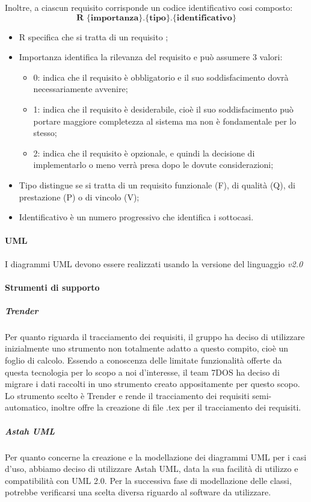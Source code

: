 Inoltre, a ciascun requisito corrisponde un codice identificativo cosi composto:
$$ \textbf{R \{importanza\}.\{tipo\}.\{identificativo\}  } $$
\begin{itemize}
	\item R specifica che si tratta di un requisito ;
	\item Importanza identifica la rilevanza del requisito e può assumere 3 valori:
	\begin{itemize}
		\item 0: indica che il requisito è obbligatorio e il suo soddisfacimento dovrà necessariamente avvenire;
		\item 1: indica che il requisito è desiderabile, cioè il suo soddisfacimento può portare maggiore completezza al sistema ma non è fondamentale per lo stesso;
		\item 2: indica che il requisito è opzionale, e quindi la decisione di implementarlo o meno verrà presa dopo le dovute considerazioni;
	\end{itemize}
	\item Tipo distingue se si tratta di un requisito funzionale (F), di qualità (Q), di prestazione (P) o di vincolo (V);
	\item Identificativo è un numero progressivo che identifica i sottocasi.
\end{itemize}
\paragraph{UML}\Spazio
I diagrammi UML devono essere realizzati usando la versione del linguaggio \emph{v2.0}
\paragraph{Strumenti di supporto}
\subparagraph{Trender}\Spazio
Per quanto riguarda il tracciamento dei requisiti, il gruppo ha deciso di utilizzare inizialmente uno strumento non totalmente adatto a questo compito, cioè un foglio di calcolo. Essendo a conoscenza delle limitate funzionalità offerte da questa tecnologia per lo scopo a noi d'interesse, il team 7DOS ha deciso di migrare i dati raccolti in uno strumento creato appositamente per questo scopo. Lo strumento scelto è Trender e rende il tracciamento dei requisiti semi-automatico, inoltre offre la creazione di file .tex per il tracciamento dei requisiti.
\subparagraph{Astah UML}\Spazio
Per quanto concerne la creazione e la modellazione dei diagrammi UML per i casi d'uso, abbiamo deciso di utilizzare Astah UML, data la sua facilità di utilizzo e compatibilità con UML 2.0. Per la successiva fase di modellazione delle classi, potrebbe verificarsi una scelta diversa riguardo al software da utilizzare.
